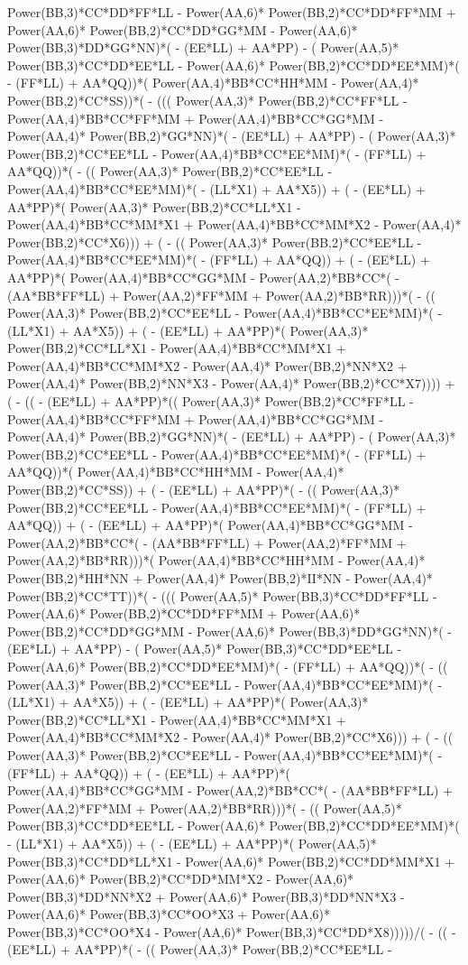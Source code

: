 \documentclass[10pt]{article} %
\begin{document}
Power(BB,3)*CC*DD*FF*LL -  Power(AA,6)* Power(BB,2)*CC*DD*FF*MM +  Power(AA,6)* Power(BB,2)*CC*DD*GG*MM -  Power(AA,6)* Power(BB,3)*DD*GG*NN)*( - (EE*LL) + AA*PP) - ( Power(AA,5)* Power(BB,3)*CC*DD*EE*LL -  Power(AA,6)* Power(BB,2)*CC*DD*EE*MM)*( - (FF*LL) + AA*QQ))*( Power(AA,4)*BB*CC*HH*MM -  Power(AA,4)* Power(BB,2)*CC*SS))*( - ((( Power(AA,3)* Power(BB,2)*CC*FF*LL -  Power(AA,4)*BB*CC*FF*MM +  Power(AA,4)*BB*CC*GG*MM -  Power(AA,4)* Power(BB,2)*GG*NN)*( - (EE*LL) + AA*PP) - ( Power(AA,3)* Power(BB,2)*CC*EE*LL -  Power(AA,4)*BB*CC*EE*MM)*( - (FF*LL) + AA*QQ))*( - (( Power(AA,3)* Power(BB,2)*CC*EE*LL -  Power(AA,4)*BB*CC*EE*MM)*( - (LL*X1) + AA*X5)) + ( - (EE*LL) + AA*PP)*( Power(AA,3)* Power(BB,2)*CC*LL*X1 -  Power(AA,4)*BB*CC*MM*X1 +  Power(AA,4)*BB*CC*MM*X2 -  Power(AA,4)* Power(BB,2)*CC*X6))) + ( - (( Power(AA,3)* Power(BB,2)*CC*EE*LL -  Power(AA,4)*BB*CC*EE*MM)*( - (FF*LL) + AA*QQ)) + ( - (EE*LL) + AA*PP)*( Power(AA,4)*BB*CC*GG*MM -  Power(AA,2)*BB*CC*( - (AA*BB*FF*LL) +  Power(AA,2)*FF*MM +  Power(AA,2)*BB*RR)))*( - (( Power(AA,3)* Power(BB,2)*CC*EE*LL -  Power(AA,4)*BB*CC*EE*MM)*( - (LL*X1) + AA*X5)) + ( - (EE*LL) + AA*PP)*( Power(AA,3)* Power(BB,2)*CC*LL*X1 -  Power(AA,4)*BB*CC*MM*X1 +  Power(AA,4)*BB*CC*MM*X2 -  Power(AA,4)* Power(BB,2)*NN*X2 +  Power(AA,4)* Power(BB,2)*NN*X3 -  Power(AA,4)* Power(BB,2)*CC*X7)))) + ( - (( - (EE*LL) + AA*PP)*(( Power(AA,3)* Power(BB,2)*CC*FF*LL -  Power(AA,4)*BB*CC*FF*MM +  Power(AA,4)*BB*CC*GG*MM -  Power(AA,4)* Power(BB,2)*GG*NN)*( - (EE*LL) + AA*PP) - ( Power(AA,3)* Power(BB,2)*CC*EE*LL -  Power(AA,4)*BB*CC*EE*MM)*( - (FF*LL) + AA*QQ))*( Power(AA,4)*BB*CC*HH*MM -  Power(AA,4)* Power(BB,2)*CC*SS)) + ( - (EE*LL) + AA*PP)*( - (( Power(AA,3)* Power(BB,2)*CC*EE*LL -  Power(AA,4)*BB*CC*EE*MM)*( - (FF*LL) + AA*QQ)) + ( - (EE*LL) + AA*PP)*( Power(AA,4)*BB*CC*GG*MM -  Power(AA,2)*BB*CC*( - (AA*BB*FF*LL) +  Power(AA,2)*FF*MM +  Power(AA,2)*BB*RR)))*( Power(AA,4)*BB*CC*HH*MM -  Power(AA,4)* Power(BB,2)*HH*NN +  Power(AA,4)* Power(BB,2)*II*NN -  Power(AA,4)* Power(BB,2)*CC*TT))*( - ((( Power(AA,5)* Power(BB,3)*CC*DD*FF*LL -  Power(AA,6)* Power(BB,2)*CC*DD*FF*MM +  Power(AA,6)* Power(BB,2)*CC*DD*GG*MM -  Power(AA,6)* Power(BB,3)*DD*GG*NN)*( - (EE*LL) + AA*PP) - ( Power(AA,5)* Power(BB,3)*CC*DD*EE*LL -  Power(AA,6)* Power(BB,2)*CC*DD*EE*MM)*( - (FF*LL) + AA*QQ))*( - (( Power(AA,3)* Power(BB,2)*CC*EE*LL -  Power(AA,4)*BB*CC*EE*MM)*( - (LL*X1) + AA*X5)) + ( - (EE*LL) + AA*PP)*( Power(AA,3)* Power(BB,2)*CC*LL*X1 -  Power(AA,4)*BB*CC*MM*X1 +  Power(AA,4)*BB*CC*MM*X2 -  Power(AA,4)* Power(BB,2)*CC*X6))) + ( - (( Power(AA,3)* Power(BB,2)*CC*EE*LL -  Power(AA,4)*BB*CC*EE*MM)*( - (FF*LL) + AA*QQ)) + ( - (EE*LL) + AA*PP)*( Power(AA,4)*BB*CC*GG*MM -  Power(AA,2)*BB*CC*( - (AA*BB*FF*LL) +  Power(AA,2)*FF*MM +  Power(AA,2)*BB*RR)))*( - (( Power(AA,5)* Power(BB,3)*CC*DD*EE*LL -  Power(AA,6)* Power(BB,2)*CC*DD*EE*MM)*( - (LL*X1) + AA*X5)) + ( - (EE*LL) + AA*PP)*( Power(AA,5)* Power(BB,3)*CC*DD*LL*X1 -  Power(AA,6)* Power(BB,2)*CC*DD*MM*X1 +  Power(AA,6)* Power(BB,2)*CC*DD*MM*X2 -  Power(AA,6)* Power(BB,3)*DD*NN*X2 +  Power(AA,6)* Power(BB,3)*DD*NN*X3 -  Power(AA,6)* Power(BB,3)*CC*OO*X3 +  Power(AA,6)* Power(BB,3)*CC*OO*X4 -  Power(AA,6)* Power(BB,3)*CC*DD*X8)))))/( - (( - (EE*LL) + AA*PP)*( - (( Power(AA,3)* Power(BB,2)*CC*EE*LL -  
\end{document}
